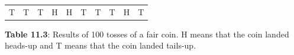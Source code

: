 {\begin{center}
\begin{xtabular*}{\mytablewidth}[t]{|p{10\mystarwidth}|p{10\mystarwidth}|p{10\mystarwidth}|p{10\mystarwidth}|p{10\mystarwidth}|p{10\mystarwidth}|p{10\mystarwidth}|p{10\mystarwidth}|p{10\mystarwidth}|p{10\mystarwidth}|}
     \tabularnewline{}
        T &
        T &
        T &
        H &
        H &
        T &
        T &
        T &
        H &
        T%
     \tabularnewline{}
    \end{xtabular*}
      \end{center}
    \begin{center}{\small\bfseries Table 11.3}: Results of 100 tosses of a fair coin. H means that the coin
landed heads-up and T means that the coin landed tails-up.\end{center}
        }%
